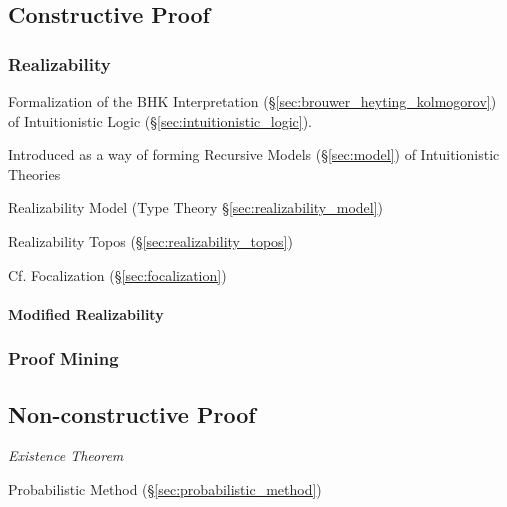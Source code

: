 \subsection{Constructive Proof}\label{sec:constructive_proof}

\subsubsection{Realizability}\label{sec:realizability}

Formalization of the BHK Interpretation
(\S\ref{sec:brouwer_heyting_kolmogorov}) of Intuitionistic Logic
(\S\ref{sec:intuitionistic_logic}).

Introduced as a way of forming Recursive Models (\S\ref{sec:model}) of
Intuitionistic Theories

Realizability Model (Type Theory \S\ref{sec:realizability_model})

Realizability Topos (\S\ref{sec:realizability_topos})

\fist Cf. Focalization (\S\ref{sec:focalization})



\paragraph{Modified Realizability}\label{sec:modified_realizability}\hfill



\subsubsection{Proof Mining}\label{sec:proof_mining}



\subsection{Non-constructive Proof}\label{sec:nonconstructive_proof}

\emph{Existence Theorem}

Probabilistic Method (\S\ref{sec:probabilistic_method})



